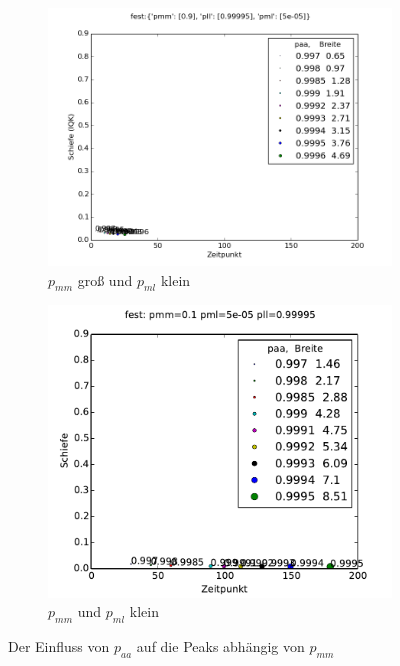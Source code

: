 \begin{figure}[h]
\begin{subfigure}[t]{0.49\textwidth}
\includegraphics[width=\textwidth]{bilder/paa/3fest_09_5e-05_p_099995}
\caption{$p_{mm}$ groß und $p_{ml}$ klein}
\end{subfigure}
\begin{subfigure}[t]{0.49\textwidth}
\includegraphics[width=\textwidth]{bilder/paa/3fest_01_5e-05_p_099995}
\caption{$p_{mm}$ und $p_{ml}$ klein}
\end{subfigure}
\caption{Der Einfluss von $p_{aa}$ auf die Peaks abhängig von $p_{mm}$}
\label{einfluss_paa}
\end{figure}


